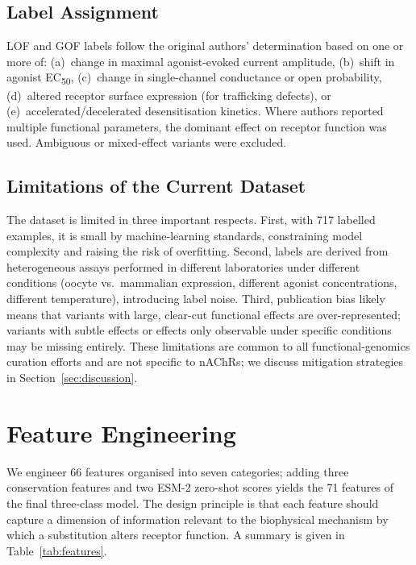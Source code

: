 \documentclass{ws-procs11x85}
\begin{document}
\subsection{Label Assignment}

LOF and GOF labels follow the original authors' determination based
on one or more of: (a)~change in maximal agonist-evoked current
amplitude, (b)~shift in agonist EC\textsubscript{50}, (c)~change in
single-channel conductance or open probability, (d)~altered receptor
surface expression (for trafficking defects), or
(e)~accelerated/decelerated desensitisation kinetics. Where authors
reported multiple functional parameters, the dominant effect on
receptor function was used. Ambiguous or mixed-effect variants were
excluded.

\subsection{Limitations of the Current Dataset}

The dataset is limited in three important respects. First, with
717 labelled examples, it is small by machine-learning standards,
constraining model complexity and raising the risk of overfitting.
Second, labels are derived from heterogeneous assays performed in
different laboratories under different conditions (oocyte vs.\
mammalian expression, different agonist concentrations, different
temperature), introducing label noise. Third, publication bias likely
means that variants with large, clear-cut functional effects are
over-represented; variants with subtle effects or effects only
observable under specific conditions may be missing entirely. These
limitations are common to all functional-genomics curation efforts
and are not specific to nAChRs; we discuss mitigation strategies in
Section~\ref{sec:discussion}.

\section{Feature Engineering}\label{sec:features}

We engineer 66 features organised into seven categories; adding three
conservation features and two ESM-2 zero-shot scores yields the 71
features of the final three-class model. The design principle is that
each feature should capture a dimension of information relevant to the
biophysical mechanism by which a substitution alters receptor function.
A summary is given in Table~\ref{tab:features}.
\end{document}
